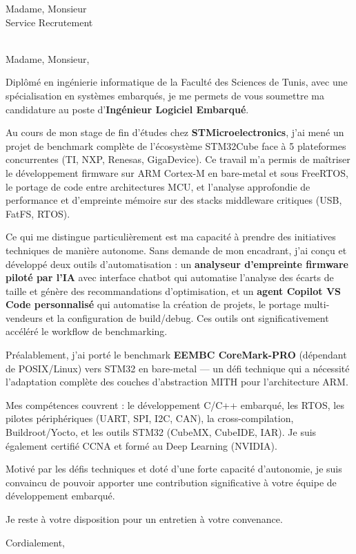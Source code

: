 \documentclass[11pt,a4paper]{letter}
\begin{document}
\begin{letter}{Madame, Monsieur \\ Service Recrutement \\ [Nom de l'entreprise] \\ [Adresse]}

\opening{Madame, Monsieur,}

Dipl\^om\'e en ing\'enierie informatique de la Facult\'e des Sciences de Tunis, avec une sp\'ecialisation en syst\`emes embarqu\'es, je me permets de vous soumettre ma candidature au poste d'\textbf{Ing\'enieur Logiciel Embarqu\'e}.

Au cours de mon stage de fin d'\'etudes chez \textbf{STMicroelectronics}, j'ai men\'e un projet de benchmark compl\`ete de l'\'ecosyst\`eme STM32Cube face \`a 5 plateformes concurrentes (TI, NXP, Renesas, GigaDevice). Ce travail m'a permis de ma\^itriser le d\'eveloppement firmware sur ARM Cortex-M en bare-metal et sous FreeRTOS, le portage de code entre architectures MCU, et l'analyse approfondie de performance et d'empreinte m\'emoire sur des stacks middleware critiques (USB, FatFS, RTOS).

Ce qui me distingue particuli\`erement est ma capacit\'e \`a prendre des initiatives techniques de mani\`ere autonome. Sans demande de mon encadrant, j'ai con\c{c}u et d\'evelopp\'e deux outils d'automatisation : un \textbf{analyseur d'empreinte firmware pilot\'e par l'IA} avec interface chatbot qui automatise l'analyse des \'ecarts de taille et g\'en\`ere des recommandations d'optimisation, et un \textbf{agent Copilot VS Code personnalis\'e} qui automatise la cr\'eation de projets, le portage multi-vendeurs et la configuration de build/debug. Ces outils ont significativement acc\'el\'er\'e le workflow de benchmarking.

Pr\'ealablement, j'ai port\'e le benchmark \textbf{EEMBC CoreMark-PRO} (d\'ependant de POSIX/Linux) vers STM32 en bare-metal --- un d\'efi technique qui a n\'ecessit\'e l'adaptation compl\`ete des couches d'abstraction MITH pour l'architecture ARM.

Mes comp\'etences couvrent : le d\'eveloppement C/C++ embarqu\'e, les RTOS, les pilotes p\'eriph\'eriques (UART, SPI, I2C, CAN), la cross-compilation, Buildroot/Yocto, et les outils STM32 (CubeMX, CubeIDE, IAR). Je suis \'egalement certifi\'e CCNA et form\'e au Deep Learning (NVIDIA).

Motiv\'e par les d\'efis techniques et dot\'e d'une forte capacit\'e d'autonomie, je suis convaincu de pouvoir apporter une contribution significative \`a votre \'equipe de d\'eveloppement embarqu\'e.

Je reste \`a votre disposition pour un entretien \`a votre convenance.

\closing{Cordialement,}

\end{letter}
\end{document}
